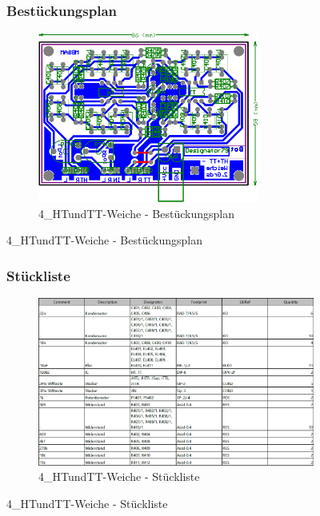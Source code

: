 \begin{figure}
	\subsubsection*{Bestückungsplan}
	\begin{figure} [H]
		\centering
		\includegraphics[width=0.8\textwidth]{img/Print4/4_TTuHTWeiche-Best.png}
		\caption{4\_HTundTT-Weiche - Bestückungsplan}
		\label {fig:8.10.14}
	\end{figure}
\end{figure}

\begin{figure}
	\subsubsection*{Stückliste}
	\begin{figure} [H]
		\centering
		\includegraphics[width=1\textwidth]{img/Print4/4_TTuHTWeiche-Blist.png}
		\caption{4\_HTundTT-Weiche - Stückliste}
		\label {fig:8.10.15}
	\end{figure}
\end{figure}




